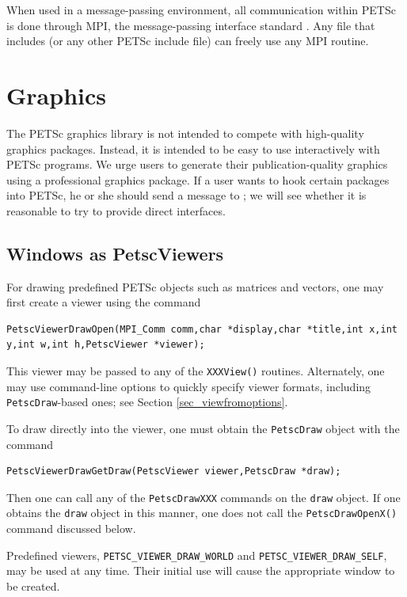 {{{When used in a message-passing environment, all communication 
within
PETSc is done through MPI, the message-passing interface standard
\cite{MPI-final}.  Any file that includes  (or any other
PETSc include file) can freely use any MPI routine.

\section{Graphics}
\label{sec_graphics}

The PETSc graphics library is not intended to compete with
high-quality graphics packages.  Instead, it is intended to be
easy to use interactively with PETSc programs. We urge users
to generate their publication-quality graphics using a
professional graphics package. If a user wants to hook
certain packages into PETSc, he or she should send a message to
\href{mailto:petsc-maint@mcs.anl.gov}{};
we will see whether it is reasonable to try to provide direct interfaces.

\subsection{Windows as PetscViewers}
For drawing predefined PETSc objects such as matrices and vectors, one may
first create a viewer using the
command
\begin{lstlisting}
PetscViewerDrawOpen(MPI_Comm comm,char *display,char *title,int x,int y,int w,int h,PetscViewer *viewer);
\end{lstlisting}
This viewer may be passed to any of the \lstinline{XXXView()} routines.
Alternately, one may use command-line options to quickly specify viewer formats,
including \lstinline{PetscDraw}-based ones; see Section \ref{sec_viewfromoptions}.

To draw directly into the viewer, one must obtain the \lstinline{PetscDraw} object with the
command
\begin{lstlisting}
PetscViewerDrawGetDraw(PetscViewer viewer,PetscDraw *draw);
\end{lstlisting}
Then one can call any of the \lstinline{PetscDrawXXX} commands on the \lstinline{draw}
object. If one obtains the \lstinline{draw} object in this manner,
one does not call the \lstinline{PetscDrawOpenX()} command discussed below.

Predefined viewers, \lstinline{PETSC_VIEWER_DRAW_WORLD}
and \lstinline{PETSC_VIEWER_DRAW_SELF}, may be used at any time. Their initial
use will cause the appropriate window to be created.

}}}
